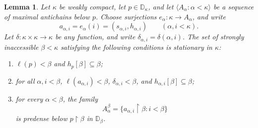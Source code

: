 \documentclass[11pt,a4paper]{amsart}
\newtheorem{lemma}[theorem]{Lemma}
\theoremstyle{definition}
\theoremstyle{remark}
\newcommand{\D}{\mathbb D}
\begin{document}
\begin{lemma}\label{lem:reflection}
Let \(\kappa\) be weakly compact, let \(p\in\D_\kappa\), and
let \(\langle A_\alpha:\alpha<\kappa\rangle\) be a sequence of
maximal antichains below \(p\). Choose surjections
\(e_\alpha:\kappa\to A_\alpha\), and write
\[
 a_{\alpha,i}=e_\alpha(i)
             =(s_{\alpha,i},h_{\alpha,i})
                    \qquad(\alpha,i<\kappa).
\]
Let \(\delta:\kappa\times\kappa\to\kappa\) be any function,
and write \(\delta_{\alpha,i}=\delta(\alpha,i)\).
The set of strongly inaccessible \(\beta<\kappa\) satisfying the
following conditions is stationary in \(\kappa\):
\begin{enumerate}[label=\textup{(\roman*)}]
\item \(\ell(p)<\beta\) and \(h_p[\beta]\subseteq\beta\);
\item for all \(\alpha,i<\beta\),
      \(\ell(a_{\alpha,i})<\beta\),
      \(\delta_{\alpha,i}<\beta\), and
      \(h_{\alpha,i}[\beta]\subseteq\beta\);
\item for every \(\alpha<\beta\), the family
\[
 A_\alpha^\beta=
 \{a_{\alpha,i}\restriction\beta:i<\beta\}
\]
is predense below \(p\restriction\beta\) in \(\D_\beta\).
\end{enumerate}
\end{lemma}
\end{document}
